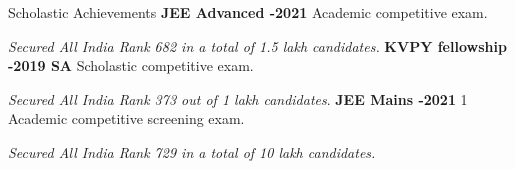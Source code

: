 \begin{rubric}{Scholastic Achievements}
\entry*
	\textbf{JEE Advanced -2021} Academic competitive exam.
	\par \emph{Secured All India Rank 682 in a total of 1.5 lakh candidates.}
%
\entry*
	\textbf{KVPY fellowship -2019 SA} Scholastic competitive exam.\par
	\emph{Secured All India Rank 373 out of 1 lakh candidates}.
%
\entry*
	\textbf{JEE Mains -2021} 1 Academic competitive screening exam.
	\par \emph{Secured All India Rank 729 in a total of 10 lakh candidates.}
\end{rubric}